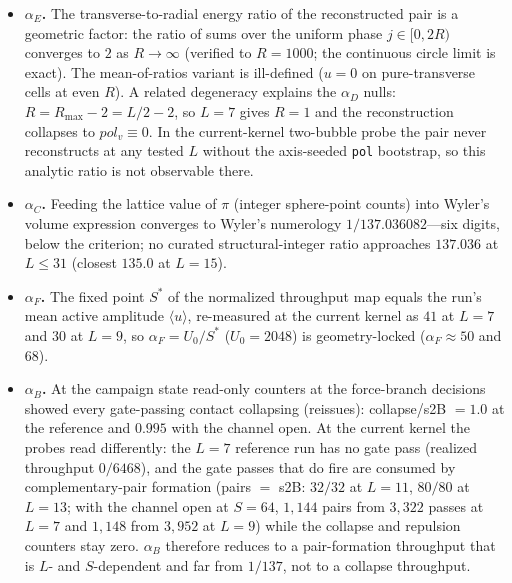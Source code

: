 \documentclass[11pt,a4paper]{article}
\begin{document}
\begin{itemize}
  \item \textbf{$\alpha_E$.} The transverse-to-radial energy ratio of the
        reconstructed pair is a geometric factor: the ratio of sums over the
        uniform phase $j\in[0,2R)$ converges to $2$ as $R\to\infty$ (verified
        to $R=1000$; the continuous circle limit is exact). The
        mean-of-ratios variant is ill-defined ($u=0$ on pure-transverse cells
        at even $R$). A related degeneracy explains the $\alpha_D$ nulls:
        $R=R_{\max}-2=L/2-2$, so $L=7$ gives $R=1$ and the reconstruction
        collapses to $pol_v\equiv0$.  In the current-kernel two-bubble probe
        the pair never reconstructs at any tested $L$ without the
        axis-seeded \texttt{pol} bootstrap, so this analytic ratio is not
        observable there.
  \item \textbf{$\alpha_C$.} Feeding the lattice value of $\pi$ (integer
        sphere-point counts) into Wyler's volume expression converges to
        Wyler's numerology $1/137.036082$---six digits, below the criterion;
        no curated structural-integer ratio approaches $137.036$ at
        $L\le31$ (closest $135.0$ at $L=15$).
  \item \textbf{$\alpha_F$.} The fixed point $S^*$ of the normalized
        throughput map equals the run's mean active amplitude
        $\langle u\rangle$, re-measured at the current kernel as $41$ at
        $L=7$ and $30$ at $L=9$, so $\alpha_F=U_0/S^*$ ($U_0=2048$) is
        geometry-locked ($\alpha_F\approx50$ and $68$).
  \item \textbf{$\alpha_B$.} At the campaign state read-only counters at the
        force-branch decisions showed every gate-passing contact collapsing
        (reissues): collapse/s2B $=1.0$ at the reference and $0.995$ with the
        channel open.  At the current kernel the probes read differently:
        the $L=7$ reference run has no gate pass (realized throughput
        $0/6468$), and the gate passes that do fire are consumed by
        complementary-pair formation (pairs $=$ s2B: $32/32$ at $L=11$,
        $80/80$ at $L=13$; with the channel open at $S=64$, $1{,}144$ pairs
        from $3{,}322$ passes at $L=7$ and $1{,}148$ from $3{,}952$ at
        $L=9$) while the collapse and repulsion counters stay zero.
        $\alpha_B$ therefore reduces to a pair-formation throughput that is
        $L$- and $S$-dependent and far from $1/137$, not to a collapse
        throughput.
\end{itemize}
\end{document}
